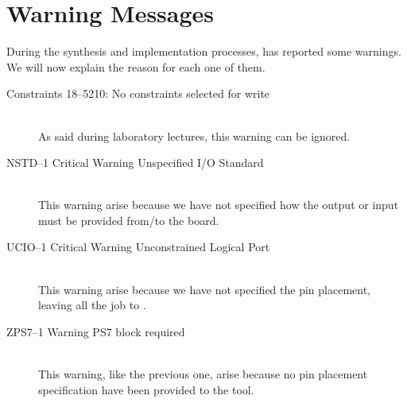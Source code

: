 \section{Warning Messages}\label{sec:warnings}

During the synthesis and implementation processes, \vivado* has reported some
warnings. We will now explain the reason for each one of them.
\begin{description}
	\item[Constraints 18--5210: No constraints selected for write]\hfill\\
		As said during laboratory lectures, this warning can be
		ignored.
	\item[NSTD--1 Critical Warning Unspecified I/O Standard]\hfill\\
		This warning arise because we have not specified how the output
		or input must be provided from/to the board.
	\item[UCIO--1 Critical Warning Unconstrained Logical Port]\hfill\\
		This warning arise because we have not specified the pin
		placement, leaving all the job to \vivado*.
	\item[ZPS7--1 Warning PS7 block required]\hfill\\
		This warning, like the previous one, arise because no pin
		placement specification have been provided to the tool.
\end{description}

